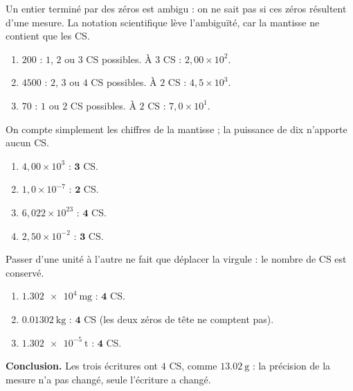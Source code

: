 \documentclass[11pt,a4paper]{article}
\begin{document}
\begin{corrige}
Un entier terminé par des zéros est ambigu : on ne sait pas si ces zéros résultent d'une mesure. La
notation scientifique lève l'ambiguïté, car la mantisse ne contient que les CS.
\begin{enumerate}[label=\alph*)]
  \item $200$ : $1$, $2$ ou $3$ CS possibles. À $3$ CS : $\boxed{2,00\times10^{2}}$.
  \item $4500$ : $2$, $3$ ou $4$ CS possibles. À $2$ CS : $\boxed{4,5\times10^{3}}$.
  \item $70$ : $1$ ou $2$ CS possibles. À $2$ CS : $\boxed{7,0\times10^{1}}$.
\end{enumerate}
\end{corrige}

\begin{corrige}
On compte simplement les chiffres de la mantisse ; la puissance de dix n'apporte aucun CS.
\begin{enumerate}[label=\alph*)]
  \item $4,00\times10^{3}$ : $\mathbf{3}$ CS.
  \item $1,0\times10^{-7}$ : $\mathbf{2}$ CS.
  \item $6,022\times10^{23}$ : $\mathbf{4}$ CS.
  \item $2,50\times10^{-2}$ : $\mathbf{3}$ CS.
\end{enumerate}
\end{corrige}

\begin{corrige}
Passer d'une unité à l'autre ne fait que déplacer la virgule : le nombre de CS est conservé.
\begin{enumerate}[label=\alph*)]
  \item $\num{1,302e4}\ \si{\milli\gram}$ : $\mathbf{4}$ CS.
  \item $\qty{0,01302}{\kilo\gram}$ : $\mathbf{4}$ CS (les deux zéros de tête ne comptent pas).
  \item $\num{1,302e-5}\ \si{\tonne}$ : $\mathbf{4}$ CS.
\end{enumerate}
\textbf{Conclusion.} Les trois écritures ont $4$ CS, comme $\qty{13,02}{\gram}$ : la précision de la
mesure n'a pas changé, seule l'écriture a changé.
\end{corrige}
\end{document}
